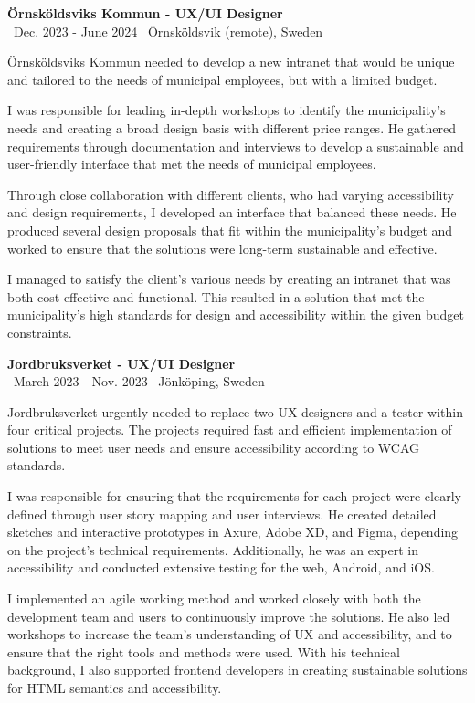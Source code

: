 \documentclass[a4paper,10pt]{article}
\begin{document}
\vspace{0.5cm}
\textbf{Örnsköldsviks Kommun - UX/UI Designer}\\
\normalsize \faCalendar \ Dec. 2023 - June 2024 \quad \faMapMarker \ Örnsköldsvik (remote), Sweden

Örnsköldsviks Kommun needed to develop a new intranet that would be unique and tailored to the needs of municipal employees, but with a limited budget.

I was responsible for leading in-depth workshops to identify the municipality's needs and creating a broad design basis with different price ranges. He gathered requirements through documentation and interviews to develop a sustainable and user-friendly interface that met the needs of municipal employees.

Through close collaboration with different clients, who had varying accessibility and design requirements, I developed an interface that balanced these needs. He produced several design proposals that fit within the municipality's budget and worked to ensure that the solutions were long-term sustainable and effective.

I managed to satisfy the client's various needs by creating an intranet that was both cost-effective and functional. This resulted in a solution that met the municipality's high standards for design and accessibility within the given budget constraints.

\vspace{0.5cm}
\textbf{Jordbruksverket - UX/UI Designer}\\
\normalsize \faCalendar \ March 2023 - Nov. 2023 \quad \faMapMarker \ Jönköping, Sweden

Jordbruksverket urgently needed to replace two UX designers and a tester within four critical projects. The projects required fast and efficient implementation of solutions to meet user needs and ensure accessibility according to WCAG standards.

I was responsible for ensuring that the requirements for each project were clearly defined through user story mapping and user interviews. He created detailed sketches and interactive prototypes in Axure, Adobe XD, and Figma, depending on the project's technical requirements. Additionally, he was an expert in accessibility and conducted extensive testing for the web, Android, and iOS.

I implemented an agile working method and worked closely with both the development team and users to continuously improve the solutions. He also led workshops to increase the team's understanding of UX and accessibility, and to ensure that the right tools and methods were used. With his technical background, I also supported frontend developers in creating sustainable solutions for HTML semantics and accessibility.
\end{document}
